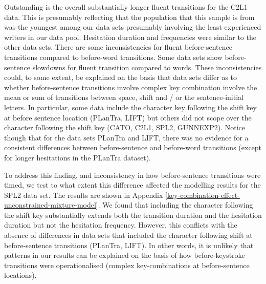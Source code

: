 \documentclass[
  man,floatsintext]{apa7}
\begin{document}
Outstanding is the overall substantially longer fluent transitions for the C2L1 data. This is presumably reflecting that the population that this sample is from was the youngest among our data sets presumably involving the least experienced writers in our data pool. Hesitation duration and frequencies were similar to the other data sets. There are some inconsistencies for fluent before-sentence transitions compared to before-word transitions. Some data sets show before-sentence slowdowns for fluent transition compared to words. These inconsistencies could, to some extent, be explained on the basis that data sets differ as to whether before-sentence transitions involve complex key combination involve the mean or sum of transitions between space, shift and / or the sentence-initial letters. In particular, some data include the character key following the shift key at before sentence location (PLanTra, LIFT) but others did not scope over the character following the shift key (CATO, C2L1, SPL2, GUNNEXP2). Notice though that for the data sets PLanTra and LIFT, there was no evidence for a consistent differences between before-sentence and before-word transitions (except for longer hesitations in the PLanTra dataset).

To address this finding, and inconsistency in how before-sentence transitions were timed, we test to what extent this difference affected the modelling results for the SPL2 data set. The results are shown in Appendix \ref{key-combination-effect-unconstrained-mixture-model}. We found that including the character following the shift key substantially extends both the transition duration and the hesitation duration but not the hesitation frequency. However, this conflicts with the absence of differences in data sets that included the character following shift at before-sentence transitions (PLanTra, LIFT). In other words, it is unlikely that patterns in our results can be explained on the basis of how before-keystroke transitions were operationalised (complex key-combinations at before-sentence locations).
\end{document}
